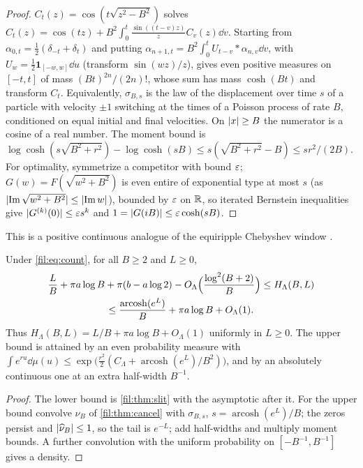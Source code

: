 \begin{proof}
$C_t(z)=\cos(t\sqrt{z^2-B^2})$ solves $C_t(z)=\cos(tz)+B^2\int_0^t\frac{\sin((t-v)z)}zC_v(z)\dd v$. Starting from
$\alpha_{0,t}=\tfrac12(\delta_{-t}+\delta_t)$ and putting $\alpha_{n+1,t}=B^2\int_0^tU_{t-v}*\alpha_{n,v}\dd v$, with
$U_w=\tfrac12\mathbf1_{[-w,w]}\dd u$ (transform $\sin(wz)/z$), gives even positive measures on $[-t,t]$ of mass
$(Bt)^{2n}/(2n)!$, whose sum has mass $\cosh(Bt)$ and transform $C_t$. Equivalently, $\sigma_{B,s}$ is the law of
the displacement over time $s$ of a particle with velocity $\pm1$ switching at the times of a Poisson process of
rate $B$, conditioned on equal initial and final velocities. On $\lvert x\rvert\ge B$ the numerator is a cosine of a real
number. The moment bound is $\log\cosh(s\sqrt{B^2+r^2})-\log\cosh(sB)\le s(\sqrt{B^2+r^2}-B)\le sr^2/(2B)$. For
optimality, symmetrize a competitor with bound $\varepsilon$; $G(w)=F(\sqrt{w^2+B^2})$ is even entire of exponential
type at most $s$ (as $\lvert\operatorname{Im}\sqrt{w^2+B^2}\rvert\le\lvert\operatorname{Im} w\rvert$), bounded by $\varepsilon$ on $\mathbb{R}$, so iterated Bernstein
inequalities \cite{RahmanTariq2009Bernstein} give $\lvert G^{(k)}(0)\rvert\le\varepsilon s^k$ and
$1=\lvert G(iB)\rvert\le\varepsilon\cosh(sB)$.
\end{proof}

This is a positive continuous analogue of the equiripple Chebyshev window \cite{Dolph1946Current}.

\begin{theorem}\label{fil:thm:optsupport}
Under \eqref{fil:eq:count}, for all $B\ge2$ and $L\ge0$,
\begin{multline*}
 \frac LB+\pi a\log B+\pi(b-a\log2)-O_\Lambda\Bigl(\frac{\log^2(B+2)}B\Bigr)\le H_\Lambda(B,L)\\
 \le\frac{\operatorname{arcosh}(e^L)}B+\pi a\log B+O_\Lambda(1).
\end{multline*}
Thus $H_\Lambda(B,L)=L/B+\pi a\log B+O_\Lambda(1)$ uniformly in $L\ge0$. The upper bound is attained by an even
probability measure with $\int e^{ru}\dd\mu(u)\le\exp\bigl(\frac{r^2}2(C_\Lambda+\operatorname{arcosh}(e^L)/B^2)\bigr)$, and by an
absolutely continuous one at an extra half-width $B^{-1}$.
\end{theorem}

\begin{proof}
The lower bound is \cref{fil:thm:slit} with the asymptotic after it. For the upper bound convolve $\nu_B$ of
\cref{fil:thm:cancel} with $\sigma_{B,s}$, $s=\operatorname{arcosh}(e^L)/B$; the zeros persist and
$\lvert\widehat\nu_B\rvert\le1$, so the tail is $e^{-L}$; add half-widths and multiply moment bounds. A further
convolution with the uniform probability on $[-B^{-1},B^{-1}]$ gives a density.
\end{proof}

